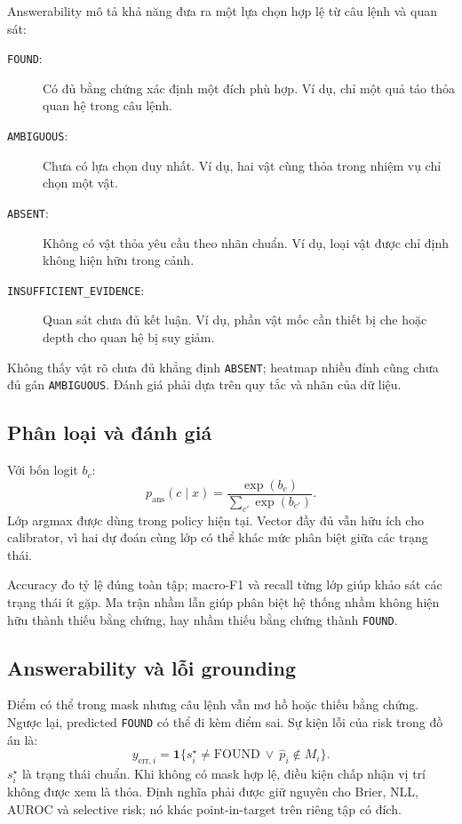 Answerability mô tả khả năng đưa ra một lựa chọn hợp lệ từ câu lệnh và quan sát:
\begin{description}
    \item[\texttt{FOUND}:] Có đủ bằng chứng xác định một đích phù hợp. Ví dụ, chỉ một quả táo thỏa quan hệ trong câu lệnh.
    \item[\texttt{AMBIGUOUS}:] Chưa có lựa chọn duy nhất. Ví dụ, hai vật cùng thỏa trong nhiệm vụ chỉ chọn một vật.
    \item[\texttt{ABSENT}:] Không có vật thỏa yêu cầu theo nhãn chuẩn. Ví dụ, loại vật được chỉ định không hiện hữu trong cảnh.
    \item[\texttt{INSUFFICIENT\_EVIDENCE}:] Quan sát chưa đủ kết luận. Ví dụ, phần vật mốc cần thiết bị che hoặc depth cho quan hệ bị suy giảm.
\end{description}
Không thấy vật rõ chưa đủ khẳng định \texttt{ABSENT}; heatmap nhiều đỉnh cũng chưa đủ gán \texttt{AMBIGUOUS}. Đánh giá phải dựa trên quy tắc và nhãn của dữ liệu.

\subsection{Phân loại và đánh giá}

Với bốn logit $b_c$:
\begin{equation}
    p_{\mathrm{ans}}(c\mid x)=
    \frac{\exp(b_c)}{\sum_{c'}\exp(b_{c'})}.
    \label{eq:theory-answerability-softmax}
\end{equation}
Lớp argmax được dùng trong policy hiện tại. Vector đầy đủ vẫn hữu ích cho calibrator, vì hai dự đoán cùng lớp có thể khác mức phân biệt giữa các trạng thái.

Accuracy đo tỷ lệ đúng toàn tập; macro-F1 và recall từng lớp giúp khảo sát các trạng thái ít gặp. Ma trận nhầm lẫn giúp phân biệt hệ thống nhầm không hiện hữu thành thiếu bằng chứng, hay nhầm thiếu bằng chứng thành \texttt{FOUND}.

\subsection{Answerability và lỗi grounding}

Điểm có thể trong mask nhưng câu lệnh vẫn mơ hồ hoặc thiếu bằng chứng. Ngược lại, predicted \texttt{FOUND} có thể đi kèm điểm sai. Sự kiện lỗi của risk trong đồ án là:
\begin{equation}
    y_{\mathrm{err},i}=
    \mathbf{1}\{s_i^\star\neq\mathrm{FOUND}
        \ \lor\ \widehat{p}_i\notin M_i\}.
    \label{eq:theory-error-event}
\end{equation}
$s_i^\star$ là trạng thái chuẩn. Khi không có mask hợp lệ, điều kiện chấp nhận vị trí không được xem là thỏa. Định nghĩa phải được giữ nguyên cho Brier, NLL, AUROC và selective risk; nó khác point-in-target trên riêng tập có đích.

